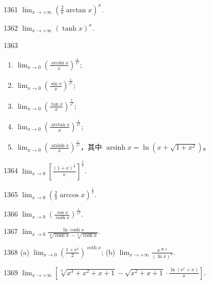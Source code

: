 \begin{prob}[S]{1361}
$\lim_{x \to +\infty} \left( \frac{2}{\pi}\arctan x \right)^x$.
\end{prob}

\begin{prob}[S]{1362}
$\lim_{x \to +\infty} (\tanh x)^x$.
\end{prob}

\begin{prob}[L]{1363}
\begin{enumerate}[label=(\alph*), itemsep=2pt, topsep=3pt]
\item $\lim_{x \to 0} \left( \frac{\arcsin x}{x} \right)^{\frac{1}{x^2}}$;
\item $\lim_{x \to 0} \left( \frac{\sin x}{x} \right)^{\frac{1}{x^2}}$;
\item $\lim_{x \to 0} \left( \frac{\tan x}{x} \right)^{\frac{1}{x^2}}$;
\item $\lim_{x \to 0} \left( \frac{\arctan x}{x} \right)^{\frac{1}{x^2}}$;
\item $\lim_{x \to 0} \left( \frac{\operatorname{arsinh} x}{x} \right)^{\frac{1}{x^2}}$，其中 $\operatorname{arsinh} x = \ln(x + \sqrt{1 + x^2})$。
\end{enumerate}
\end{prob}

\begin{prob}[S]{1364}
$\lim_{x \to 0} \left[ \frac{(1 + x)^{\frac{1}{x}}}{\mathrm{e}} \right]^{\frac{1}{x}}$.
\end{prob}

\begin{prob}[S]{1365}
$\lim_{x \to 0} \left( \frac{2}{\pi}\arccos x \right)^{\frac{1}{x}}$.
\end{prob}

\begin{prob}[S]{1366}
$\lim_{x \to 0} \left( \frac{\cos x}{\cosh x} \right)^{\frac{1}{x^2}}$.
\end{prob}

\begin{prob}[S]{1367}
$\lim_{x \to 0} \frac{\ln\cosh x}{\sqrt[m]{\cosh x} - \sqrt[n]{\cosh x}}$.
\end{prob}

\begin{prob}[M]{1368}
(a) $\lim_{x \to 0} \left( \frac{1 + \mathrm{e}^x}{2} \right)^{\coth x}$; \qquad (b) $\lim_{x \to +\infty} \frac{x^{\ln x}}{(\ln x)^x}$.
\end{prob}

\begin{prob}[S]{1369}
$\lim_{x \to +\infty} \left[ \sqrt[3]{x^3 + x^2 + x + 1} - \sqrt{x^2 + x + 1} \cdot \frac{\ln(\mathrm{e}^x + x)}{x} \right]$.
\end{prob}

